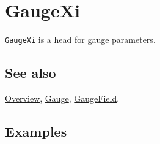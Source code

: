 \documentclass[../FeynCalcManual.tex]{subfiles}
\begin{document}
\hypertarget{gaugexi}{
\section{GaugeXi}\label{gaugexi}}

\texttt{GaugeXi} is a head for gauge parameters.

\subsection{See also}

\hyperlink{toc}{Overview}, \hyperlink{gauge}{Gauge},
\hyperlink{gaugefield}{GaugeField}.

\subsection{Examples}
\end{document}
